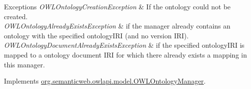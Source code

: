 \begin{DoxyExceptions}{Exceptions}
{\em O\-W\-L\-Ontology\-Creation\-Exception} & If the ontology could not be created. \\
\hline
{\em O\-W\-L\-Ontology\-Already\-Exists\-Exception} & if the manager already contains an ontology with the specified {\ttfamily ontology\-I\-R\-I} (and no version I\-R\-I). \\
\hline
{\em O\-W\-L\-Ontology\-Document\-Already\-Exists\-Exception} & if the specified {\ttfamily ontology\-I\-R\-I} is mapped to a ontology document I\-R\-I for which there already exists a mapping in this manager. \\
\hline
\end{DoxyExceptions}


Implements \hyperlink{interfaceorg_1_1semanticweb_1_1owlapi_1_1model_1_1_o_w_l_ontology_manager_a5da936373b5dee2929d124601734dbc9}{org.\-semanticweb.\-owlapi.\-model.\-O\-W\-L\-Ontology\-Manager}.

